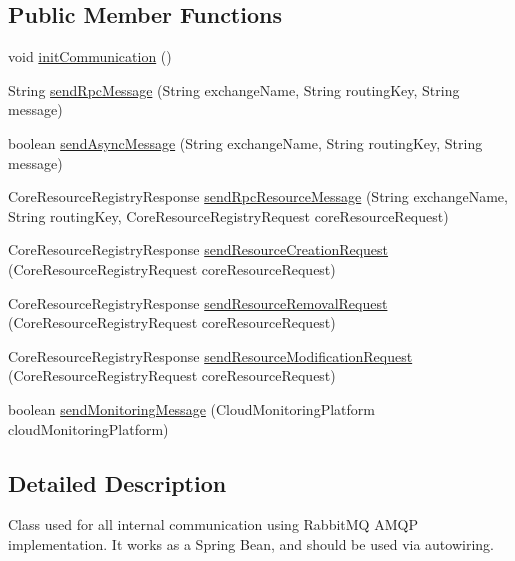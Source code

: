 \subsection*{Public Member Functions}
\begin{DoxyCompactItemize}
\item 
void \hyperlink{classeu_1_1h2020_1_1symbiote_1_1communication_1_1RabbitManager_a30abf6a670122eb22a8105a206858616}{init\+Communication} ()
\item 
String \hyperlink{classeu_1_1h2020_1_1symbiote_1_1communication_1_1RabbitManager_a822ebbed01755311ca9038bb7fa43591}{send\+Rpc\+Message} (String exchange\+Name, String routing\+Key, String message)
\item 
boolean \hyperlink{classeu_1_1h2020_1_1symbiote_1_1communication_1_1RabbitManager_aaf8fea1645c8e35ed2a1d8f8e2b4356f}{send\+Async\+Message} (String exchange\+Name, String routing\+Key, String message)
\item 
Core\+Resource\+Registry\+Response \hyperlink{classeu_1_1h2020_1_1symbiote_1_1communication_1_1RabbitManager_a98ca7f2122e2e4bb12d2252163177f0e}{send\+Rpc\+Resource\+Message} (String exchange\+Name, String routing\+Key, Core\+Resource\+Registry\+Request core\+Resource\+Request)
\item 
Core\+Resource\+Registry\+Response \hyperlink{classeu_1_1h2020_1_1symbiote_1_1communication_1_1RabbitManager_a4356c09360119574086e8c7ae7d7e676}{send\+Resource\+Creation\+Request} (Core\+Resource\+Registry\+Request core\+Resource\+Request)
\item 
Core\+Resource\+Registry\+Response \hyperlink{classeu_1_1h2020_1_1symbiote_1_1communication_1_1RabbitManager_a4ccbd77fad17957b8384cf53bf0af5e2}{send\+Resource\+Removal\+Request} (Core\+Resource\+Registry\+Request core\+Resource\+Request)
\item 
Core\+Resource\+Registry\+Response \hyperlink{classeu_1_1h2020_1_1symbiote_1_1communication_1_1RabbitManager_a2d8ecc7c67f2215a4e03dd082c6e39c0}{send\+Resource\+Modification\+Request} (Core\+Resource\+Registry\+Request core\+Resource\+Request)
\item 
boolean \hyperlink{classeu_1_1h2020_1_1symbiote_1_1communication_1_1RabbitManager_a18b771d2db6a06469a6776ebf0ff96e1}{send\+Monitoring\+Message} (Cloud\+Monitoring\+Platform cloud\+Monitoring\+Platform)
\end{DoxyCompactItemize}


\subsection{Detailed Description}
Class used for all internal communication using Rabbit\+MQ A\+M\+QP implementation. It works as a Spring Bean, and should be used via autowiring. 

